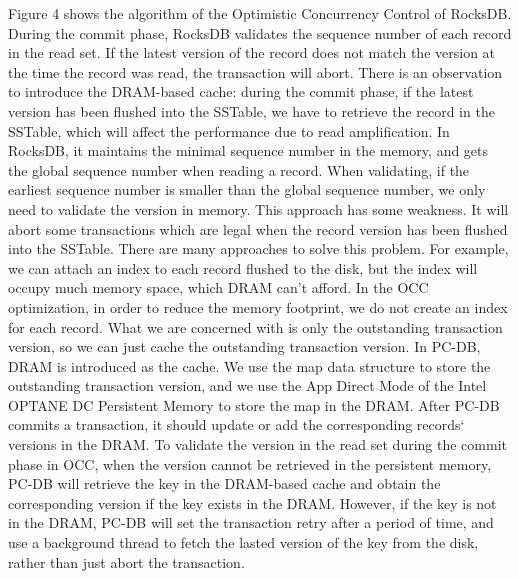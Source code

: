 Figure 4 shows the algorithm of the Optimistic Concurrency Control of RocksDB. During the commit phase, RocksDB validates the sequence number of each record in the read set. If the latest version of the record does not match the version at the time the record was read, the transaction will abort. There is an observation to introduce the DRAM-based cache: during the commit phase, if the latest version has been flushed into the SSTable, we have to retrieve the record in the SSTable, which will affect the performance due to read amplification. In RocksDB, it maintains the minimal sequence number in the memory, and gets the global sequence number when reading a record. When validating, if the earliest sequence number is smaller than the global sequence number, we only need to validate the version in memory. This approach has some weakness. It will abort some transactions which are legal when the record version has been flushed into the SSTable. There are many approaches to solve this problem. For example, we can attach an index to each record flushed to the disk, but the index will occupy much memory space, which DRAM can't afford. In the OCC optimization, in order to reduce the memory footprint, we do not create an index for each record. What we are concerned with is only the outstanding transaction version, so we can just cache the outstanding transaction version. In PC-DB, DRAM is introduced as the cache. We use the map data structure to store the outstanding transaction version, and we use the App Direct Mode of the Intel OPTANE DC Persistent Memory to store the map in the DRAM. After PC-DB commits a transaction, it should update or add the corresponding records` versions in the DRAM. To validate the version in the read set during the commit phase in OCC, when the version cannot be retrieved in the persistent memory, PC-DB will retrieve  the key in the  DRAM-based cache and obtain the corresponding version if the key exists in the DRAM. However, if the key is not in the DRAM, PC-DB will set the transaction retry after a period of time, and use a background thread to fetch the lasted version of the key from the disk, rather than just abort the transaction. 